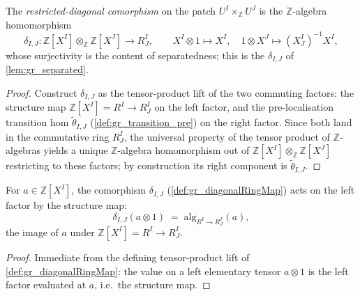 \begin{definition}

  \label{def:gr_diagonalRingMap}
  The \emph{restricted-diagonal comorphism} on the patch \(U^I \times_{\mathbb{Z}}
  U^J\) is the \(\mathbb{Z}\)-algebra homomorphism
  \[
    \delta_{I,J} : \mathbb{Z}[X^I] \otimes_{\mathbb{Z}} \mathbb{Z}[X^J]
    \longrightarrow R^I_J,
    \qquad
    X^I \otimes 1 \mapsto X^I, \quad
    1 \otimes X^J \mapsto (X^I_J)^{-1} X^I,
  \]
  whose surjectivity is the content of separatedness; this is the \(\delta_{I,J}\)
  of \cref{lem:gr_separated}.
\end{definition}
\begin{proof}
  \leanok
  Construct \(\delta_{I,J}\) as the tensor-product lift of the two commuting
  factors: the structure map \(\mathbb{Z}[X^I] = R^I \to R^I_J\) on the left
  factor, and the pre-localisation transition hom \(\tilde\theta_{I,J}\)
  (\cref{def:gr_transition_pre}) on the right factor. Since both land in the
  commutative ring \(R^I_J\), the universal property of the tensor product of
  \(\mathbb{Z}\)-algebras yields a unique \(\mathbb{Z}\)-algebra homomorphism out
  of \(\mathbb{Z}[X^I] \otimes_{\mathbb{Z}} \mathbb{Z}[X^J]\) restricting to these
  factors; by construction its right component is \(\tilde\theta_{I,J}\).
\end{proof}

\begin{lemma}

  \label{lem:gr_diagonalRingMap_left}
  For \(a \in \mathbb{Z}[X^I]\), the comorphism \(\delta_{I,J}\)
  (\cref{def:gr_diagonalRingMap}) acts on the left factor by the structure map:
  \[
    \delta_{I,J}(a \otimes 1) \;=\; \mathrm{alg}_{R^I \to R^I_J}(a),
  \]
  the image of \(a\) under \(\mathbb{Z}[X^I] = R^I \to R^I_J\).
\end{lemma}
\begin{proof}
  \leanok
  Immediate from the defining tensor-product lift of
  \cref{def:gr_diagonalRingMap}: the value on a left elementary tensor \(a \otimes
  1\) is the left factor evaluated at \(a\), i.e.\ the structure map.
\end{proof}


